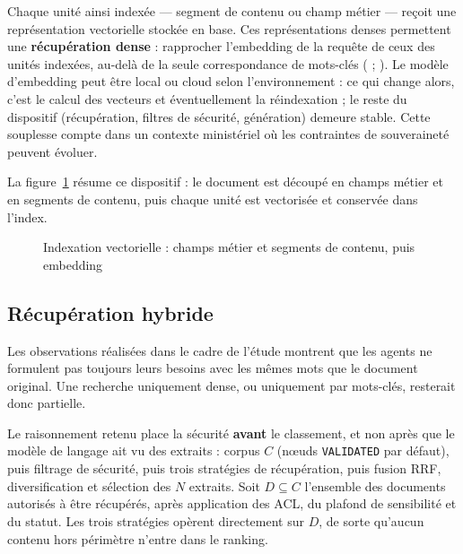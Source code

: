 Chaque unité ainsi indexée --- segment de contenu ou champ métier --- reçoit une représentation vectorielle stockée en base. Ces représentations denses permettent une \textbf{récupération dense} : rapprocher l'embedding de la requête de ceux des unités indexées, au-delà de la seule correspondance de mots-clés ( ; ). Le modèle d'embedding peut être local ou cloud selon l'environnement : ce qui change alors, c'est le calcul des vecteurs et éventuellement la réindexation ; le reste du dispositif (récupération, filtres de sécurité, génération) demeure stable. Cette souplesse compte dans un contexte ministériel où les contraintes de souveraineté peuvent évoluer.

La figure~\ref{fig:indexation-vectorielle} résume ce dispositif : le document est découpé en champs métier et en segments de contenu, puis chaque unité est vectorisée et conservée dans l'index.

\begin{figure}[H]
\centering
\resizebox{0.92\textwidth}{!}{}
\caption{Indexation vectorielle : champs métier et segments de contenu, puis embedding}
\label{fig:indexation-vectorielle}
\end{figure}

\subsection{Récupération hybride}

Les observations réalisées dans le cadre de l'étude montrent que les agents ne formulent pas toujours leurs besoins avec les mêmes mots que le document original. Une recherche uniquement dense, ou uniquement par mots-clés, resterait donc partielle.

Le raisonnement retenu place la sécurité \textbf{avant} le classement, et non après que le modèle de langage ait vu des extraits : corpus $C$ (nœuds \texttt{VALIDATED} par défaut), puis filtrage de sécurité, puis trois stratégies de récupération, puis fusion RRF, diversification et sélection des $N$ extraits. Soit $D \subseteq C$ l'ensemble des documents autorisés à être récupérés, après application des ACL, du plafond de sensibilité et du statut. Les trois stratégies opèrent directement sur $D$, de sorte qu'aucun contenu hors périmètre n'entre dans le ranking.

